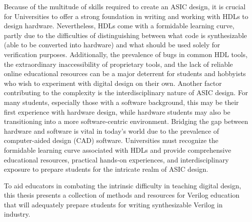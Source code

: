 Because of the multitude of skills required to create an ASIC design, it is crucial for Universities to offer a strong foundation in writing and working with HDLs to design hardware.
Nevertheless, HDLs come with a formidable learning curve, partly due to the difficulties of distinguishing between what code is synthesizable (able to be converted into hardware) and what should be used solely for verification purposes.
Additionally, the prevalence of bugs in common HDL tools, the extraordinary inaccessibility of proprietary tools, and the lack of reliable online educational resources can be a major deterrent for students and hobbyists who wish to experiment with digital design on their own.
Another factor contributing to the complexity is the interdisciplinary nature of ASIC design.
For many students, especially those with a software background, this may be their first experience with hardware design, while hardware students may also be transitioning into a more software-centric environment.
Bridging the gap between hardware and software is vital in today's world due to the prevalence of computer-aided design (CAD) software.
Universities must recognize the formidable learning curve associated with HDLs and provide comprehensive educational resources, practical hands-on experiences, and interdisciplinary exposure to prepare students for the intricate realm of ASIC design.

To aid educators in combating the intrinsic difficulty in teaching digital design, this thesis presents a collection of methods and resources for Verilog education that will adequately prepare students for writing synthesizable Verilog in industry.


